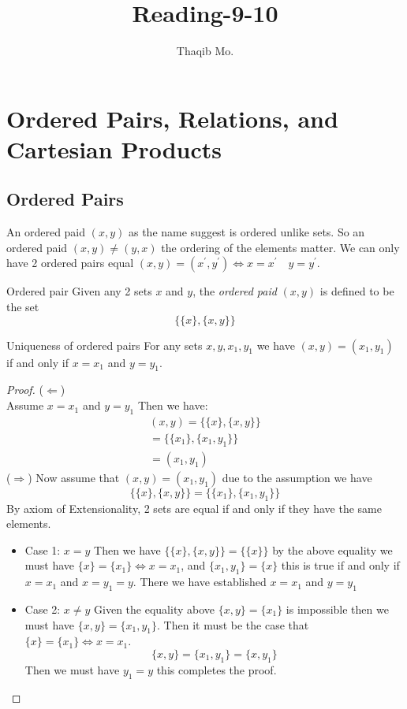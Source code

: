 \documentclass[16pt,a4paper]{article}
\author{Thaqib Mo.}
\title{ Reading-9-10 }
\theoremstyle{definition}
\begin{document}
\maketitle
\newpage
\section{Ordered Pairs, Relations, and Cartesian Products}
\subsection{Ordered Pairs}
An ordered paid $(x,y)$ as the name suggest is ordered unlike sets. So an ordered paid $(x,y) \neq (y,x)$ the ordering of the elements matter. We can only have 2 ordered pairs equal $(x,y) = (x^\prime, y^\prime) \iff x = x^\prime\quad y = y^\prime$. \\
\begin{defn}{Ordered pair}{}
Given any 2 sets $x$ and $y$, the \textit{ordered paid} $(x,y)$ is defined to be the set \[\{\{x\}, \{x,y\}\}\]
\end{defn}
\begin{thm}{Uniqueness of ordered pairs}{}
For any sets $x,y,x_1, y_1$ we have $(x,y) = (x_1, y_1)$ if and only if $x = x_1$ and $y = y_1$. 
\end{thm}
\begin{proof}
($\Leftarrow$)\\
Assume $x = x_1$ and $y = y_1$
Then we have:
\begin{align*}
(x,y) = \{\{x\}, \{x,y\}\}\\
= \{\{x_1\}, \{x_1,y_1\}\}\\
= (x_1, y_1)
\end{align*}
($\Rightarrow$)
Now assume that $(x,y) = (x_1, y_1)$ due to the assumption we have
\[\{\{x\}, \{x,y\}\} = \{\{x_1\}, \{x_1,y_1\}\}\]
By axiom of Extensionality, 2 sets are equal if and only if they have the same elements. 
\begin{itemize}
\item Case 1: $x = y$
Then we have $\{\{x\}, \{x,y\}\} =  \{\{x\}\}$ by the above equality we must have $\{x\} = \{x_1\} \iff x = x_1$, and $\{x_1, y_1\} = \{x\}$ this is true if and only if $x = x_1$ and $x = y_1  = y$. There we have established $x = x_1$ and $y = y_1$
\item Case 2: $x \neq y$
Given the equality above $\{x,y\} = \{x_1\}$ is impossible then we must have $\{x,y\} = \{x_1, y_1\}$. Then it must be the case that $\{x\} = \{x_1\} \iff x = x_1$. 
\[\{x,y\} = \{x_1, y_1\} = \{x,y_1\}\]
Then we must have $y_1 = y$ this completes the proof. 
\end{itemize}
\end{proof}
\end{document}
